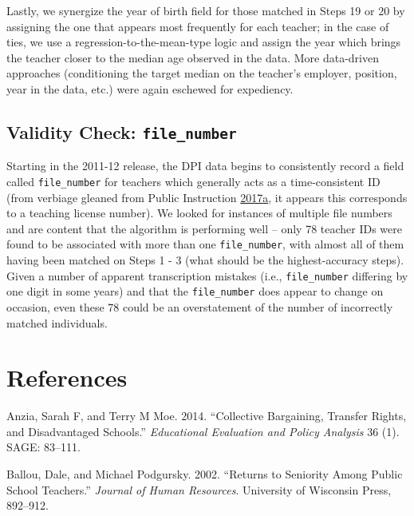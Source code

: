 \documentclass[12pt,]{article}
\newcommand{\TAG}[1]{}
\begin{document}
Lastly, we synergize the year of birth field for those matched in Steps
19 or 20 by assigning the one that appears most frequently for each
teacher; in the case of ties, we use a regression-to-the-mean-type logic
and assign the year which brings the teacher closer to the median age
observed in the data. More data-driven approaches (conditioning the
target median on the teacher's employer, position, year in the data,
etc.) were again eschewed for expediency.

\subsection{\texorpdfstring{Validity Check:
\texttt{file\_number}}{Validity Check: file\_number}}\label{validity-check-file_number}

Starting in the 2011-12 release, the DPI data begins to consistently
record a field called \texttt{file\_number} for teachers which generally
acts as a time-consistent ID (from verbiage gleaned from Public
Instruction
\protect\hyperlink{ref-dpi_errata}{2017}\protect\hyperlink{ref-dpi_errata}{a},
it appears this corresponds to a teaching license number). We looked for
instances of multiple file numbers and are content that the algorithm is
performing well -- only 78 teacher IDs were found to be associated with
more than one \texttt{file\_number}, with almost all of them having been
matched on Steps 1 - 3 (what should be the highest-accuracy steps).
Given a number of apparent transcription mistakes (i.e.,
\texttt{file\_number} differing by one digit in some years) and that the
\texttt{file\_number} does appear to change on occasion, even these 78
could be an overstatement of the number of incorrectly matched
individuals.

\TAG{END_BODY}

\section*{References}\label{references}

\hypertarget{refs}{}
\hypertarget{ref-anzia}{}
Anzia, Sarah F, and Terry M Moe. 2014. ``Collective Bargaining, Transfer
Rights, and Disadvantaged Schools.'' \emph{Educational Evaluation and
Policy Analysis} 36 (1). SAGE: 83--111.

\hypertarget{ref-ballou}{}
Ballou, Dale, and Michael Podgursky. 2002. ``Returns to Seniority Among
Public School Teachers.'' \emph{Journal of Human Resources}. University
of Wisconsin Press, 892--912.
\end{document}
